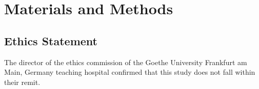 \documentclass[10pt]{article}
\begin{document}
 
\section*{Materials and Methods}
\subsection*{Ethics Statement}
The director of the ethics commission of the Goethe University Frankfurt am Main, Germany teaching hospital confirmed that this study does not fall within their remit.

%
%
%
\end{document}
